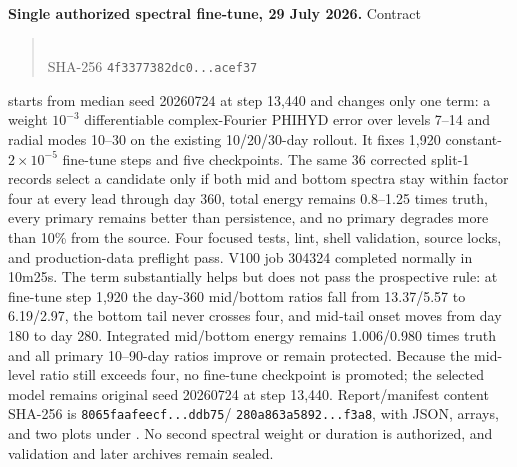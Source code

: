 \documentclass[11pt]{article}
\begin{document}
\textbf{Single authorized spectral fine-tune, 29 July 2026.}  Contract
\begin{quote}
\\
SHA-256 \texttt{4f3377382dc0...acef37}
\end{quote}
starts from median seed 20260724 at step 13,440 and changes only one term: a
weight \(10^{-3}\) differentiable complex-Fourier PHIHYD error over levels
7--14 and radial modes 10--30 on the existing 10/20/30-day rollout.  It fixes
1,920 constant-\(2\times10^{-5}\) fine-tune steps and five checkpoints.  The
same 36 corrected split-1 records select a candidate only if both mid and
bottom spectra stay within factor four at every lead through day 360, total
energy remains 0.8--1.25 times truth, every primary remains better than
persistence, and no primary degrades more than 10\% from the source.  Four
focused tests, lint, shell validation, source locks, and production-data
preflight pass.  V100 job 304324 completed normally in 10m25s.  The term
substantially helps but does not pass the prospective rule: at fine-tune step
1,920 the day-360 mid/bottom ratios fall from 13.37/5.57 to 6.19/2.97, the
bottom tail never crosses four, and mid-tail onset moves from day 180 to day
280.  Integrated mid/bottom energy remains 1.006/0.980 times truth and all
primary 10--90-day ratios improve or remain protected.  Because the mid-level
ratio still exceeds four, no fine-tune checkpoint is promoted; the selected
model remains original seed 20260724 at step 13,440.  Report/manifest content
SHA-256 is \texttt{8065faafeecf...ddb75}/
\texttt{280a863a5892...f3a8}, with JSON, arrays, and two plots under
.
No second spectral weight or duration is authorized, and validation and later
archives remain sealed.
\end{document}
